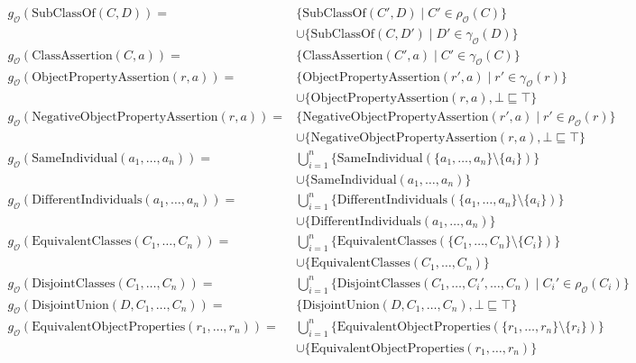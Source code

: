 \begingroup
\small
\begin{align*}
    g_\mathcal{O}(\mathrm{SubClassOf}(C, D)) =& \{\mathrm{SubClassOf}(C', D) \mid C' \in \rho_\mathcal{O} (C)\} \\& \cup \{\mathrm{SubClassOf}(C, D') \mid D' \in \gamma_\mathcal{O}  (D)\} \\
    g_\mathcal{O}(\mathrm{ClassAssertion}(C, a)) =& \{\mathrm{ClassAssertion}(C', a) \mid C' \in \gamma_\mathcal{O}  (C)\} \\
    g_\mathcal{O}(\mathrm{ObjectPropertyAssertion}(r, a)) =& \{\mathrm{ObjectPropertyAssertion}(r', a) \mid r' \in \gamma_\mathcal{O}  (r)\} \\& \cup \{ \mathrm{ObjectPropertyAssertion}(r, a), \bot \sqsubseteq \top \} \\
    g_\mathcal{O}(\mathrm{NegativeObjectPropertyAssertion}(r, a)) =& \{\mathrm{NegativeObjectPropertyAssertion}(r', a) \mid r' \in \rho_\mathcal{O}  (r)\} \\& \cup \{\mathrm{NegativeObjectPropertyAssertion}(r, a), \bot \sqsubseteq \top \} \\
    g_\mathcal{O}(\mathrm{SameIndividual}(a_1, \dots, a_n)) =& \bigcup_{i=1}^n \{ \mathrm{SameIndividual}(\{a_1, \dots, a_n\} \setminus \{a_i\}) \} \\& \cup \{ \mathrm{SameIndividual}(a_1, \dots, a_n)\} \\
    g_\mathcal{O}(\mathrm{DifferentIndividuals}(a_1, \dots, a_n)) =& \bigcup_{i=1}^n \{ \mathrm{DifferentIndividuals}(\{a_1, \dots, a_n\} \setminus \{a_i\}) \} \\& \cup \{ \mathrm{DifferentIndividuals}(a_1, \dots, a_n)\} \\
    g_\mathcal{O}(\mathrm{EquivalentClasses}(C_1, \dots, C_n)) =& \bigcup_{i=1}^n \{ \mathrm{EquivalentClasses}(\{C_1, \dots, C_n\} \setminus \{C_i\}) \} \\& \cup \{ \mathrm{EquivalentClasses}(C_1, \dots, C_n) \} \\
    g_\mathcal{O}(\mathrm{DisjointClasses}(C_1, \dots, C_n)) =& \bigcup_{i=1}^n \{ \mathrm{DisjointClasses}(C_1, \dots, C_i', \dots, C_n) \mid C_i' \in \rho_\mathcal{O}(C_i) \} \\
    g_\mathcal{O}(\mathrm{DisjointUnion}(D, C_1, \dots, C_n)) =& \{ \mathrm{DisjointUnion}(D, C_1, \dots, C_n), \bot \sqsubseteq \top \} \\
    g_\mathcal{O}(\mathrm{EquivalentObjectProperties}(r_1, \dots, r_n)) =& \bigcup_{i=1}^n \{ \mathrm{EquivalentObjectProperties}(\{r_1, \dots, r_n\} \setminus \{r_i\}) \} \\& \cup \{ \mathrm{EquivalentObjectProperties}(r_1, \dots, r_n) \} \\

\end{align*}
